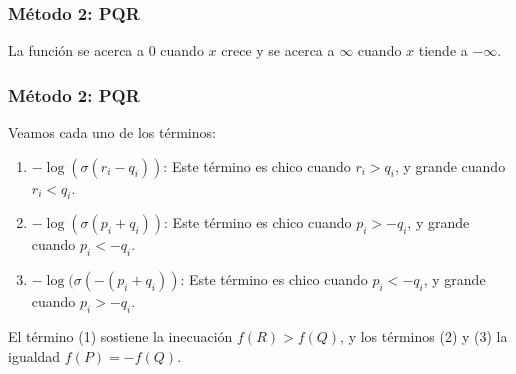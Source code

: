 \begin{frame}
\frametitle{Método 2: PQR}
\begin{figure}[H]
\centering
{}
\end{figure}
La función se acerca a 0 cuando $x$ crece y se acerca a $\infty$ cuando $x$ tiende a $-\infty$.
\end{frame}

\begin{frame}
\frametitle{Método 2: PQR}
Veamos cada uno de los términos:
\begin{enumerate}
\itemsep0em
\item $-\log(\sigma(r_i - q_i))$: Este término es chico cuando $r_i > q_i$, y grande cuando $r_i < q_i$.
\item $-\log(\sigma(p_i + q_i))$: Este término es chico cuando $p_i > -q_i$, y grande cuando $p_i < -q_i$.
\item $-\log(\sigma(-(p_i + q_i))$: Este término es chico cuando $p_i < -q_i$, y grande cuando $p_i > -q_i$.
\end{enumerate}

El término (1) sostiene la inecuación $f(R) > f(Q)$, y los términos (2) y (3) la igualdad $f(P) = -f(Q)$.
\end{frame}

